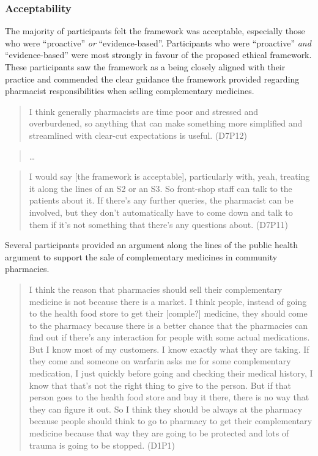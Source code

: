 \documentclass[11pt,a4paper]{article}
\begin{document}
\subsubsection{Acceptability}\label{acceptability}

The majority of participants felt the framework was acceptable,
especially those who were ``proactive'' \emph{or} ``evidence-based''.
Participants who were ``proactive'' \emph{and} ``evidence-based'' were
most strongly in favour of the proposed ethical framework. These
participants saw the framework as a being closely aligned with their
practice and commended the clear guidance the framework provided
regarding pharmacist responsibilities when selling complementary
medicines.

\begin{quote}
I think generally pharmacists are time poor and stressed and
overburdened, so anything that can make something more simplified and
streamlined with clear-cut expectations is useful. (D7P12)
\end{quote}

\begin{quote}
\ldots{}
\end{quote}

\begin{quote}
I would say {[}the framework is acceptable{]}, particularly with, yeah,
treating it along the lines of an S2 or an S3. So front-shop staff can
talk to the patients about it. If there's any further queries, the
pharmacist can be involved, but they don't automatically have to come
down and talk to them if it's not something that there's any questions
about. (D7P11)
\end{quote}

Several participants provided an argument along the lines of the public
health argument to support the sale of complementary medicines in
community pharmacies.

\begin{quote}
I think the reason that pharmacies should sell their complementary
medicine is not because there is a market. I think people, instead of
going to the health food store to get their {[}comple?{]} medicine, they
should come to the pharmacy because there is a better chance that the
pharmacies can find out if there's any interaction for people with some
actual medications. But I know most of my customers. I know exactly what
they are taking. If they come and someone on warfarin asks me for some
complementary medication, I just quickly before going and checking their
medical history, I know that that's not the right thing to give to the
person. But if that person goes to the health food store and buy it
there, there is no way that they can figure it out. So I think they
should be always at the pharmacy because people should think to go to
pharmacy to get their complementary medicine because that way they are
going to be protected and lots of trauma is going to be stopped. (D1P1)
\end{quote}
\end{document}
